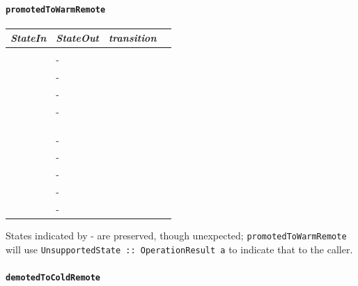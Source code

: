 \paragraph{\texttt{promotedToWarmRemote}}
\begin{center}
  \footnotesize
  \begin{tabular}[h]{llll}
    \textit{StateIn}         & \textit{StateOut} & \textit{transition} \\\hline\\[2pt]
    \InitialState{}          & - & \\[8pt]
    \ReservedOutboundState{} & - & \\[8pt]
    \UnnegotiatedStateAny{}  & - & \\[8pt]
    \OutboundStateUni{}      & - & \\[8pt]
    \OutboundStateDup{}      & \DuplexState{} & \PromotedToWarmDupRem{} \\[8pt]
    \InboundIdleStateUni{}   & \InboundStateUni{} & \AwakeUniRem{} \\[8pt]
    \InboundIdleStateDup{}   & \InboundStateDup{} & \AwakeDupRem{} \\[8pt]
    \InboundStateUni{}       & - & \\[8pt]
    \InboundStateDup{}       & - & \\[8pt]
    \DuplexState{}           & - & \\[8pt]
    \TerminatingState{}      & - & \\[8pt]
    \TerminatedState{}       & - & \\[8pt]
  \end{tabular}
\end{center}
States indicated by - are preserved, though unexpected;
\texttt{promotedToWarmRemote} will use \texttt{UnsupportedState ::
OperationResult a} to indicate that to the caller.


\paragraph{\texttt{demotedToColdRemote}}

